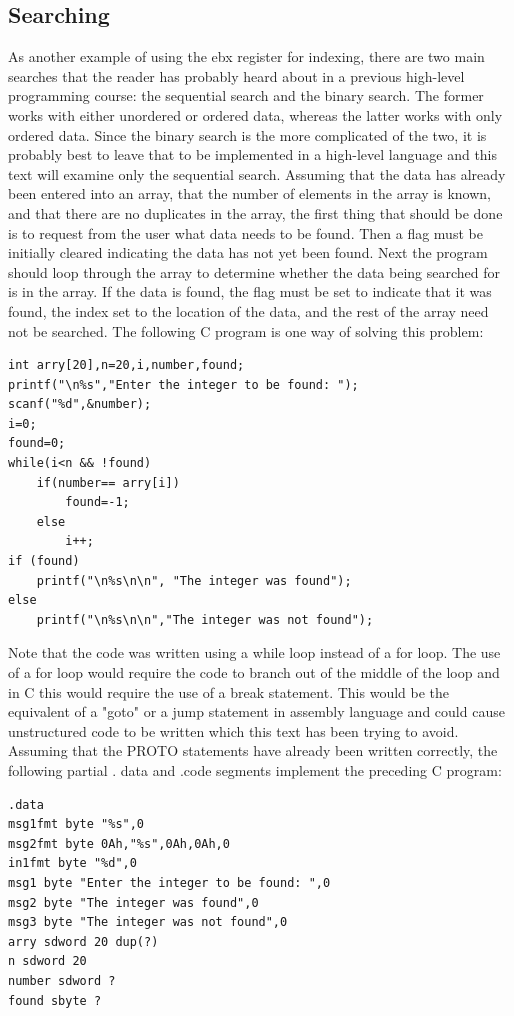 \documentclass[10pt]{book}
\begin{document}
\subsection{Searching}
As another example of using the ebx register for indexing, there are two main searches that the reader has probably heard about in a previous high-level programming course: the sequential search and the binary search. The former works with either unordered or ordered data, whereas the latter works with only ordered data. Since the binary search is the more complicated of the two, it is probably best to leave that to be implemented in a high-level language and this text will examine only the sequential search.
Assuming that the data has already been entered into an array, that the number of elements in the array is known, and that there are no duplicates in the array, the first thing that should be done is to request from the user what data needs to be found. Then a flag must be initially cleared indicating the data has not yet been found. Next the program should loop through the array to determine whether the data being searched for is in the array. If the data is found, the flag must be set to indicate that it was found, the index set to the location of the data, and the rest of the array need not be searched. The following C program is one way of solving this problem:

\begin{verbatim}
int arry[20],n=20,i,number,found;
printf("\n%s","Enter the integer to be found: ");
scanf("%d",&number);
i=0;
found=0;
while(i<n && !found)
    if(number== arry[i])
        found=-1;
    else
        i++;
if (found)
    printf("\n%s\n\n", "The integer was found");
else
    printf("\n%s\n\n","The integer was not found");
\end{verbatim}

Note that the code was written using a while loop instead of a for loop. The use of a for loop would require the code to branch out of the middle of the loop and in C this would require the use of a break statement. This would be the equivalent of a "goto" or a jump statement in assembly language and could cause unstructured code to be written which this text has been trying to avoid. Assuming that the PROTO statements have already been written correctly, the following partial . data and .code segments implement the preceding C program:

\begin{verbatim}
.data
msg1fmt byte "%s",0
msg2fmt byte 0Ah,"%s",0Ah,0Ah,0
in1fmt byte "%d",0
msg1 byte "Enter the integer to be found: ",0
msg2 byte "The integer was found",0
msg3 byte "The integer was not found",0
arry sdword 20 dup(?)
n sdword 20
number sdword ?
found sbyte ?
\end{verbatim}
\end{document}
